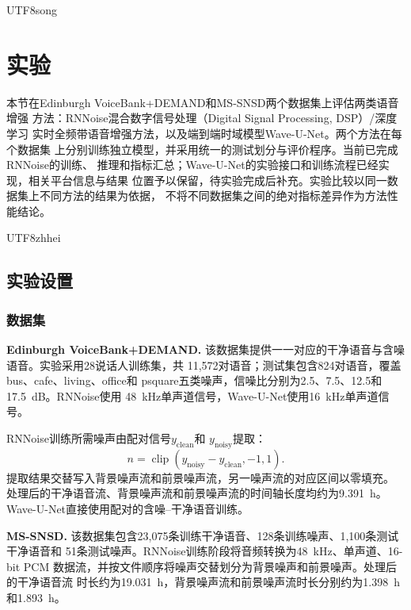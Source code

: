 \documentclass[10.5pt,compsoc]{CjC}
\theoremstyle{mystyle}
\begin{document}
\begin{CJK*}{UTF8}{song}
\section{实验}
\label{sec:experiments}

本节在Edinburgh VoiceBank+\allowbreak DEMAND和MS-SNSD两个数据集上评估两类语音增强
方法：RNNoise混合数字信号处理（Digital Signal Processing, DSP）/深度学习
实时全频带语音增强方法，以及端到端时域模型Wave-U-Net。两个方法在每个数据集
上分别训练独立模型，并采用统一的测试划分与评价程序。当前已完成RNNoise的训练、
推理和指标汇总；Wave-U-Net的实验接口和训练流程已经实现，相关平台信息与结果
位置予以保留，待实验完成后补充。实验比较以同一数据集上不同方法的结果为依据，
不将不同数据集之间的绝对指标差异作为方法性能结论。

{\begin{CJK*}{UTF8}{zhhei}\subsection{实验设置}\end{CJK*}}
\label{subsec:experimental-setup}

\subsubsection{数据集}

\textbf{Edinburgh VoiceBank+DEMAND.}
该数据集提供一一对应的干净语音与含噪语音。实验采用28说话人训练集，共
11,572对语音；测试集包含824对语音，覆盖bus、cafe、living、office和
psquare五类噪声，信噪比分别为2.5、7.5、12.5和17.5~dB。RNNoise使用
48~kHz单声道信号，Wave-U-Net使用16~kHz单声道信号。

RNNoise训练所需噪声由配对信号$y_{\mathrm{clean}}$和
$y_{\mathrm{noisy}}$提取：
\begin{equation}
n=\operatorname{clip}\left(y_{\mathrm{noisy}}-y_{\mathrm{clean}},-1,1\right).
\label{eq:noise-extraction}
\end{equation}
提取结果交替写入背景噪声流和前景噪声流，另一噪声流的对应区间以零填充。
处理后的干净语音流、背景噪声流和前景噪声流的时间轴长度均约为9.391~h。
Wave-U-Net直接使用配对的含噪--干净语音训练。

\textbf{MS-SNSD.}
该数据集包含23,075条训练干净语音、128条训练噪声、1,100条测试干净语音和
51条测试噪声。RNNoise训练阶段将音频转换为48~kHz、单声道、16-bit PCM
数据流，并按文件顺序将噪声交替划分为背景噪声和前景噪声。处理后的干净语音流
时长约为19.031~h，背景噪声流和前景噪声流时长分别约为1.398~h和1.893~h。


\end{CJK*}
\end{document}
